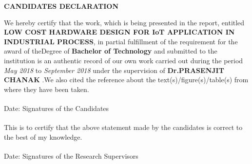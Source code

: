 \newpage
\begin{center}
{\large \bf CANDIDATES DECLARATION}
\end{center}
We hereby certify that the work, which is being presented in the report, entitled {\bf LOW COST HARDWARE DESIGN FOR IoT APPLICATION IN INDUSTRIAL PROCESS}, in partial fulfillment of the requirement for the award of theDegree of {\bf Bachelor of Technology} and submitted to the institution is an authentic record of our own work carried out
during the period \emph{May 2018} to \emph{September 2018} under the supervision of {\bf Dr.PRASENJIT CHANAK} .We also cited the reference about the text(s)/figure(s)/table(s) from where they have been taken.\\
\vspace{0.6in} \\
Date: \hspace{3.4in} Signatures of the Candidates \\
\vspace{0.2in} \\
This is to certify that the above statement made by the candidates is correct to the best of my knowledge. \\
\vspace{0.5in} \\
Date: \hspace{2.65in} Signatures of the Research Supervisors \\

